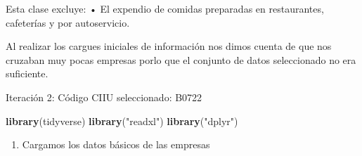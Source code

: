 \documentclass[
  11pt,
]{article}
\newenvironment{Shaded}{\begin{snugshade}}{\end{snugshade}}
\newcommand{\KeywordTok}[1]{\textcolor[rgb]{0.13,0.29,0.53}{\textbf{#1}}}
\newcommand{\NormalTok}[1]{#1}
\newcommand{\StringTok}[1]{\textcolor[rgb]{0.31,0.60,0.02}{#1}}
\providecommand{\tightlist}{%
  \setlength{\itemsep}{0pt}\setlength{\parskip}{0pt}}
\begin{document}
Esta clase excluye: • El expendio de comidas preparadas en restaurantes,
cafeterías y por autoservicio.

Al realizar los cargues iniciales de información nos dimos cuenta de que
nos cruzaban muy pocas empresas porlo que el conjunto de datos
seleccionado no era suficiente.

Iteración 2: Código CIIU seleccionado: B0722

\begin{Shaded}
\begin{Highlighting}[]
\KeywordTok{library}\NormalTok{(tidyverse)}
\KeywordTok{library}\NormalTok{(}\StringTok{"readxl"}\NormalTok{)}
\KeywordTok{library}\NormalTok{(}\StringTok{"dplyr"}\NormalTok{)}
\end{Highlighting}
\end{Shaded}

\begin{enumerate}
\def\labelenumi{\arabic{enumi}.}
\tightlist
\item
  Cargamos los datos básicos de las empresas
\end{enumerate}
\end{document}
